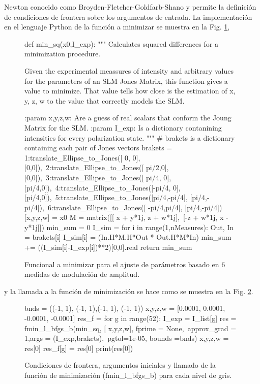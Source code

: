  Newton conocido como Broyden-Fletcher-Goldfarb-Shano y permite
 la definición de condiciones de frontera sobre los argumentos de
 entrada.  
La implementación en el lenguaje Python de la función a minimizar se
muestra en la Fig. \ref{fig:SLM_functional},  
\begin{figure}
\begin{python}
def min_sq(x0,I_exp):
    """ Calculates squared differences for a minimization procedure.

    Given the experimental meassures of intensity and arbitrary values for 
    the parameters of an SLM Jones Matrix, this function gives a value to
    minimize. That value tells how close is the estimation of x, y, z, w 
    to the value that correctly models the SLM.

    :param x,y,z,w: Are a guess of real scalars that conform the Joung Matrix for the SLM.
    :param I_exp: Is a dictionary contanining intensities for every polarization state.
    """
    # brakets is a dictionary containing each pair of Jones vectors
    brakets = {1:translate_Ellipse_to_Jones([ 0,   0],      [0,0]),\
           2:translate_Ellipse_to_Jones([ pi/2,0],      [0,0]),\
           3:translate_Ellipse_to_Jones([ pi/4, 0],    [pi/4,0]),\
           4:translate_Ellipse_to_Jones([-pi/4, 0],    [pi/4,0]),\
           5:translate_Ellipse_to_Jones([pi/4,-pi/4],   [pi/4,-pi/4]),\
           6:translate_Ellipse_to_Jones([ -pi/4,pi/4],  [pi/4,-pi/4])}
    [x,y,z,w] = x0
    M = matrix([[ x + y*1j, z + w*1j],\
                [-z + w*1j, x - y*1j]])
    min_sum = 0
    I_sim = {}
    for i in range(1,nMeasures):
        Out, In = brakets[i]
        I_sim[i] = (In.H*M.H*Out * Out.H*M*In)
        min_sum += ((I_sim[i]-I_exp[i])**2)[0,0].real    
    return min_sum
\end{python}
\caption{Funcional a minimizar para el ajuste de parámetros basado en
  6 medidas de modulación de amplitud.}
\label{fig:SLM_functional}
\end{figure}
y la llamada a la función de minimización se hace como se muestra en la
Fig. \ref{fig:SLM_minimization}.
\begin{figure}
\begin{python}
bnds = ((-1, 1), (-1, 1),(-1, 1), (-1, 1))
x,y,z,w = [0.0001, 0.0001, -0.0001, -0.0001] 
res_f = {}
for g in range(52):
    I_exp = I_list[g]
    res = fmin_l_bfgs_b(min_sq, [ x,y,z,w], fprime = None,\
                         approx_grad = 1,args = (I_exp,brakets),\
                         pgtol=1e-05, bounds =bnds)
    x,y,z,w = res[0]
    res_f[g] = res[0]
    print(res[0])
\end{python}
\caption{Condiciones de frontera, argumentos iniciales y llamado de la
función de minimización (fmin\_l\_bfgs\_b) para cada nivel de gris.}
\label{fig:SLM_minimization}
\end{figure}
